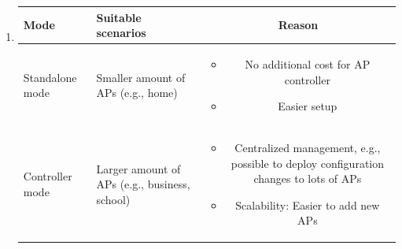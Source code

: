 \documentclass[12pt, a4paper]{article}
\begin{document}
\begin{enumerate}[label=(\alph*)]
    \item  \phantom{}\vspace{-\baselineskip}

    \begin{tabularx}{0.93\textwidth}{|
        >{\centering\arraybackslash}m{20ex}
        >{\centering\arraybackslash}m{25ex}
        C|}
      \hline
      \textbf{Mode} & \textbf{Suitable scenarios} & \textbf{Reason} \\\hline
      Standalone mode & Smaller amount of APs (e.g., home) &
      \begin{itemize}
        \item No additional cost for AP controller
        \item Easier setup
      \end{itemize} \\\hline
      Controller mode & Larger amount of APs (e.g., business, school) &
      \begin{itemize}
        \item Centralized management, e.g., possible to deploy configuration changes to lots of APs
        \item Scalability: Easier to add new APs
      \end{itemize} \\\hline
    \end{tabularx}
  \end{enumerate}

  \pagebreak
\end{document}
